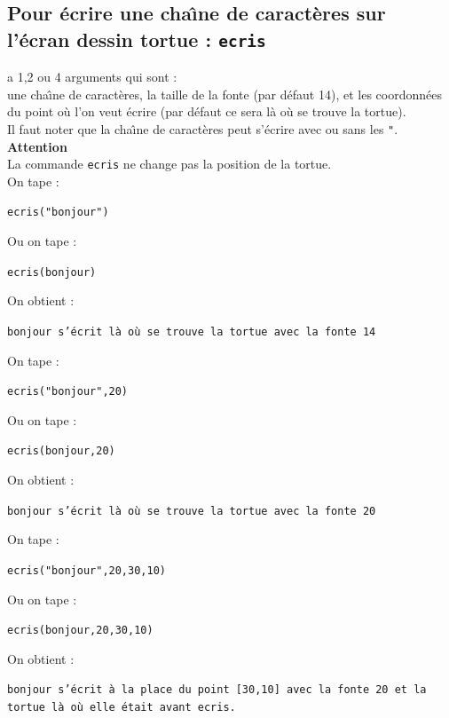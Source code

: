 \documentclass[a4paper,11pt]{book}
\begin{document}
\subsection{Pour \'ecrire une cha\^{\i}ne de caract\`eres sur l'\'ecran dessin tortue : {\tt ecris}}
 a 1,2 ou 4 arguments qui sont :\\
une cha\^{\i}ne de caract\`eres, la taille de la fonte (par d\'efaut 14), et 
les coordonn\'ees du point o\`u l'on veut \'ecrire (par d\'efaut ce sera l\`a 
o\`u se trouve la tortue).\\
Il faut noter que la cha\^{\i}ne de caract\`eres peut s'\'ecrire avec ou sans 
les {\tt "}.\\
{\bf Attention} \\
La commande {\tt ecris} ne change pas la position de la tortue.\\
On tape :\\
\begin{center}{\tt ecris("bonjour")}\end{center}
Ou on tape :\\
\begin{center}{\tt ecris(bonjour)}\end{center}
On obtient :
\begin{center}{\tt bonjour s'\'ecrit l\`a o\`u se trouve la tortue avec la fonte 14}\end{center}
On tape :\\
\begin{center}{\tt ecris("bonjour",20)}\end{center}
Ou on tape :\\
\begin{center}{\tt ecris(bonjour,20)}\end{center}
On obtient :
\begin{center}{\tt bonjour s'\'ecrit l\`a o\`u se trouve la tortue avec la fonte 20}\end{center}
On tape :\\
\begin{center}{\tt ecris("bonjour",20,30,10)}\end{center}
Ou on tape :\\
\begin{center}{\tt ecris(bonjour,20,30,10)}\end{center}
On obtient :
\begin{center}{\tt bonjour s'\'ecrit \`a la place du point [30,10] avec la fonte 20 et la tortue l\`a o\`u elle \'etait avant {\tt ecris}.}\end{center}
\end{document}
